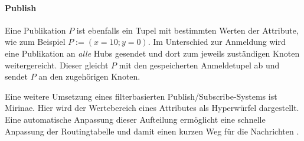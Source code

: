 \paragraph{Publish}
Eine Publikation $P$ ist ebenfalls ein Tupel mit bestimmten Werten der Attribute, wie zum Beispiel $P := (x = 10; y = 0)$. Im Unterschied zur Anmeldung wird eine Publikation an \emph{alle} Hubs gesendet und dort zum jeweils zuständigen Knoten weitergereicht. Dieser gleicht $P$ mit den gespeicherten Anmeldetupel ab und sendet $P$ an den zugehörigen Knoten.

Eine weitere Umsetzung eines filterbasierten Publish/Subscribe-Systems ist Mirinae. Hier wird der Wertebereich eines Attributes als Hyperwürfel dargestellt. Eine automatische Anpassung dieser Aufteilung ermöglicht eine schnelle Anpassung der Routingtabelle und damit einen kurzen Weg für die Nachrichten \cite{Choi2005Mirinae}.
